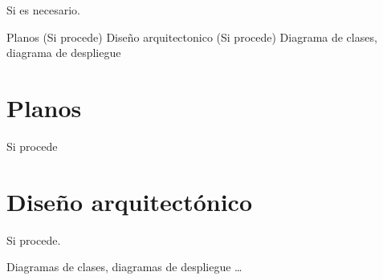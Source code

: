 
Si es necesario.


    Planos (Si procede)
    Diseño arquitectonico (Si procede)
        Diagrama de clases, diagrama de despliegue

\section{Planos}

Si procede

\section{Diseño arquitectónico}

Si procede.

Diagramas de clases, diagramas de despliegue \ldots
